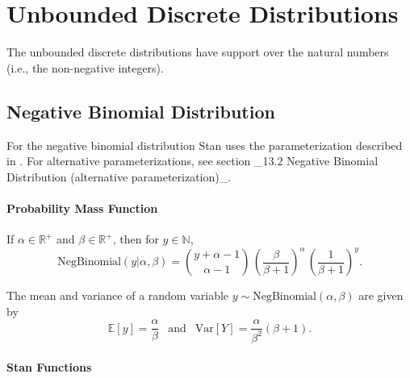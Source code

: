 \begin{description}
\begin{description}     \end{description}


\chapter{Unbounded Discrete Distributions}


The unbounded discrete distributions have support over the natural numbers (i.e., the non-negative integers).


\section{Negative Binomial Distribution}


For the negative binomial distribution Stan uses the parameterization described in \citet{GelmanEtAl:2013}.  For alternative parameterizations, see section _13.2 Negative Binomial Distribution (alternative parameterization)_.


\subsubsection{Probability Mass Function}


If $\alpha \in \mathbb{R}^+$ and $\beta \in \mathbb{R}^+$, then for $y \in \mathbb{N}$, \[ \text{NegBinomial}(y|\alpha,\beta)  = \binom{y + \alpha - 1}{\alpha - 1} \, \left( \frac{\beta}{\beta+1} \right)^{\!\alpha} \, \left( \frac{1}{\beta + 1} \right)^{\!y} \!. \] 

The mean and variance of a random variable $y \sim \text{NegBinomial}(\alpha,\beta)$ are given by \[ \mathbb{E}[y] = \frac{\alpha}{\beta} \ \ \text{ and } \ \ \text{Var}[Y] = \frac{\alpha}{\beta^2} (\beta + 1). \] 



\subsubsection{Stan Functions}



\end{description}
